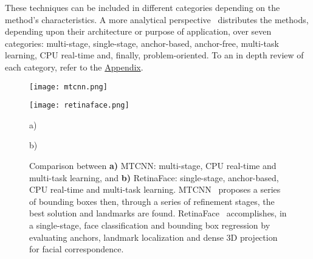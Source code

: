 \documentclass[class=report, crop=false, a4paper, 12pt]{standalone}
\begin{document}
\par These techniques can be included in different categories depending on the method's characteristics. A more analytical perspective~\autocite{duElementsEndtoendDeep2022} distributes the methods, depending upon their architecture or purpose of application, over seven categories: multi-stage, single-stage, anchor-based, anchor-free, multi-task learning, CPU real-time and, finally, problem-oriented. To an in depth review of each category, refer to the \hyperref[sec:face_detection_appendix]{Appendix}.

\vspace{0.5\baselineskip}
\begin{figure}[h!]
    \centering
    \begin{minipage}[c]{0.38\textwidth}
      \centering
      \texttt{[image: mtcnn.png]}
      \label{fig:mtcnn}
    \end{minipage}
    \hspace{0.5cm}
    \begin{minipage}[c]{0.52\textwidth}
      \centering
      \texttt{[image: retinaface.png]}
      \label{fig:retinaface}
    \end{minipage} 
    \begin{minipage}{0.4\textwidth}
        \vspace{-0.5cm}
        \centering
        \footnotesize a)
    \end{minipage}
    \hfill
    \begin{minipage}{0.4\textwidth}
        \vspace{-0.5cm}
        \centering
        \footnotesize b)
    \end{minipage}
    \vspace{-0.4cm}
    \caption{Comparison between \textbf{a)} MTCNN: multi-stage, CPU real-time and multi-task learning, and \textbf{b)} RetinaFace: single-stage, anchor-based, CPU real-time and multi-task learning. MTCNN~\autocite{zhangJointFaceDetection2016a} proposes a series of bounding boxes then, through a series of refinement stages, the best solution and landmarks are found. RetinaFace~\autocite{dengRetinaFaceSinglestageDense2019} accomplishes, in a single-stage, face classification and bounding box regression by evaluating anchors, landmark localization and dense 3D projection for facial correspondence.}
    \label{fig:mtcnn vs retinaface}
\end{figure}
\end{document}
